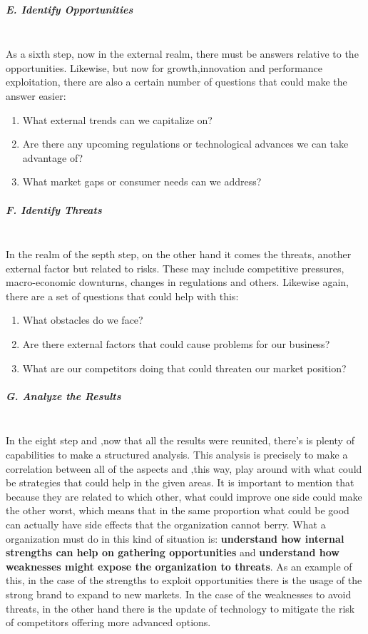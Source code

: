 \subparagraph{E. Identify Opportunities}\mbox{}\\
As a sixth step, now in the external realm, there must be answers relative to the opportunities. Likewise, but now for growth,innovation and performance exploitation, there are also a certain number of questions that could make the answer easier:
\begin{enumerate}
    \item What external trends can we capitalize on?
    \item Are there any upcoming regulations or technological advances we can take advantage of?
    \item What market gaps or consumer needs can we address?
\end{enumerate}

\subparagraph{F. Identify Threats}\mbox{}\\
In the realm of the septh step, on the other hand it comes the threats, another external factor but related to risks. These may include competitive pressures, macro-economic downturns, changes in regulations and others. Likewise again, there are a set of questions that could help with this:
\begin{enumerate}
    \item What obstacles do we face?
    \item Are there external factors that could cause problems for our business?
    \item What are our competitors doing that could threaten our market position?
\end{enumerate}

\subparagraph{G. Analyze the Results}\mbox{}\\
In the eight step and ,now that all the results were reunited, there's is plenty of capabilities to make a structured analysis. This analysis is precisely to make a correlation between all of the aspects and ,this way, play around with what could be strategies that could help in the given areas. It is important to mention that because they are related to which other, what could improve one side could make the other worst, which means that in the same proportion what could be good can actually have side effects that the organization cannot berry. 
What a organization must do in this kind of situation is: \textbf{understand how internal strengths can help on gathering opportunities} and \textbf{understand how weaknesses might expose the organization to threats}. As an example of this, in the case of the strengths to exploit opportunities there is the usage of the strong brand to expand to new markets. In the case of the weaknesses to avoid threats, in the other hand there is the update of technology to mitigate the risk of competitors offering more advanced options.

